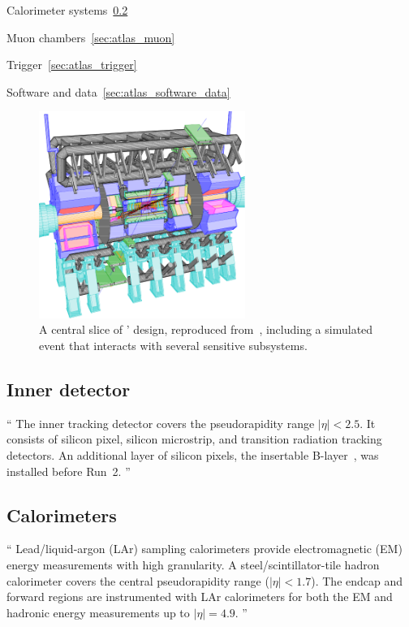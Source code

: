 Calorimeter systems~\ref{sec:atlas_calo}

Muon chambers~\ref{sec:atlas_muon}

Trigger~\ref{sec:atlas_trigger}

Software and data~\ref{sec:atlas_software_data}


\begin{figure}[tp]
\centering
\includegraphics[width=0.6\textwidth]{figures/atlas_cutaway_volume_1.pdf}
\caption[
A central slice of \atlas' design
]{%
A central slice of \atlas' design, reproduced from~\cite{atlas1999design1},
including a simulated event that interacts with several sensitive subsystems.
}
\label{fig:atlas_cutaway}
\end{figure}


\subsection{Inner detector}
\label{sec:atlas_inner}
\begin{displayquote}
``%
The inner tracking detector covers the pseudorapidity range $|\eta| < 2.5$.
It consists of silicon pixel, silicon microstrip, and transition radiation
tracking detectors.
An additional layer of silicon pixels, the insertable
B-layer~\cite{ATLAS-TDR-19, PIX-2018-001}, was installed before Run~2.%
''~\cite{atlas2022searches}
\end{displayquote}


\subsection{Calorimeters}
\label{sec:atlas_calo}
\begin{displayquote}
``%
Lead/liquid-argon (LAr) sampling calorimeters provide electromagnetic (EM)
energy measurements with high granularity.
A steel/scintillator-tile hadron calorimeter covers the central pseudorapidity
range ($|\eta| < 1.7$).
The endcap and forward regions are instrumented with LAr calorimeters for both
the EM and hadronic energy measurements up to $|\eta| = 4.9$.%
''~\cite{atlas2022searches}
\end{displayquote}

